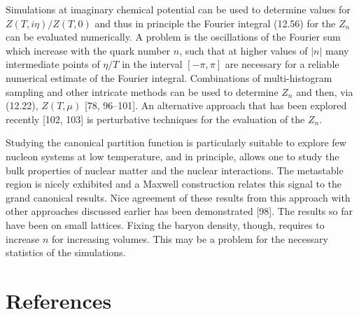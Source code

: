 Simulations at imaginary chemical potential can be used to determine values for
$Z(T,i\eta)/Z(T,0)$ and thus in principle the Fourier integral (12.56) for the
$Z_n$ can be evaluated numerically. A problem is the oscillations of the Fourier
sum which increase with the quark number $n$, such that at higher values of
$|n|$ many intermediate points of $\eta/T$ in the interval $[-\pi,\pi]$ are
necessary for a reliable numerical estimate of the Fourier integral.
Combinations of multi-histogram sampling and other intricate methods can be
used to determine $Z_n$ and then, via (12.22), $Z(T,\mu)$ [78, 96--101]. An
alternative approach that has been explored recently [102, 103] is perturbative
techniques for the evaluation of the $Z_n$.

Studying the canonical partition function is particularly suitable to explore
few nucleon systems at low temperature, and in principle, allows one to study
the bulk properties of nuclear matter and the nuclear interactions. The
metastable region is nicely exhibited and a Maxwell construction relates this
signal to the grand canonical results. Nice agreement of these results from
this approach with other approaches discussed earlier has been demonstrated
[98]. The results so far have been on small lattices. Fixing the baryon
density, though, requires to increase $n$ for increasing volumes. This may be a
problem for the necessary statistics of the simulations.


\section*{References}

